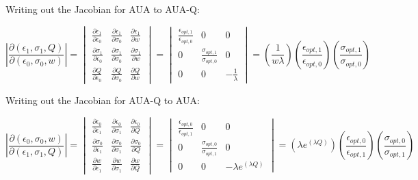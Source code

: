 \documentclass[letterpaper,12pt]{article}
\begin{document}
Writing out the Jacobian for AUA to AUA-Q:

\begin{equation}
\left | \frac{\partial(\epsilon_1,\sigma_1,Q)}{\partial (\epsilon_0,\sigma_0,w)} \right | =
\begin{vmatrix}
 \frac{\partial\epsilon_1}{\partial\epsilon_0} & \frac{\partial\epsilon_1}{\partial\sigma_0} & \frac{\partial\epsilon_1}{\partial w} \\
 \frac{\partial\sigma_1}{\partial\epsilon_0} & \frac{\partial\sigma_1}{\partial\sigma_0} & \frac{\partial\sigma_1}{\partial w} \\
 \frac{\partial Q}{\partial\epsilon_0} & \frac{\partial Q}{\partial\sigma_0} & \frac{\partial Q}{\partial w}
\end{vmatrix} = 
\begin{vmatrix}
\frac{\epsilon_{opt,1}}{\epsilon_{opt,0}} & 0 & 0 \\
0 & \frac{\sigma_{opt,1}}{\sigma_{opt,0}} & 0 \\
0 & 0 & -\frac{1}{\lambda}
\end{vmatrix}
=\left (\frac{1}{w \lambda} \right ) \left (\frac{\epsilon_{opt,1}}{\epsilon_{opt,0}} \right ) \left ( \frac{\sigma_{opt,1}}{\sigma_{opt,0}} \right )
\end{equation}

Writing out the Jacobian for AUA-Q to AUA:


\begin{equation}
\left | \frac{\partial(\epsilon_0,\sigma_0,w)}{\partial (\epsilon_1,\sigma_1,Q)} \right | =
\begin{vmatrix}
 \frac{\partial\epsilon_0}{\partial\epsilon_1} & \frac{\partial\epsilon_0}{\partial\sigma_1} & \frac{\partial\epsilon_0}{\partial Q} \\
 \frac{\partial\sigma_0}{\partial\epsilon_1} & \frac{\partial\sigma_0}{\partial\sigma_1} & \frac{\partial\sigma_0}{\partial Q} \\
 \frac{\partial w}{\partial\epsilon_1} & \frac{\partial w}{\partial\sigma_1} & \frac{\partial w}{\partial Q}
\end{vmatrix} = 
\begin{vmatrix}
\frac{\epsilon_{opt,0}}{\epsilon_{opt,1}} & 0 & 0 \\
0 & \frac{\sigma_{opt,0}}{\sigma_{opt,1}} & 0 \\
0 & 0 & -\lambda e^{(\lambda Q)}
\end{vmatrix}
=\left (\lambda e^{(\lambda Q)} \right ) \left (\frac{\epsilon_{opt,0}}{\epsilon_{opt,1}} \right ) \left ( \frac{\sigma_{opt,0}}{\sigma_{opt,1}} \right )
\end{equation}
\end{document}
